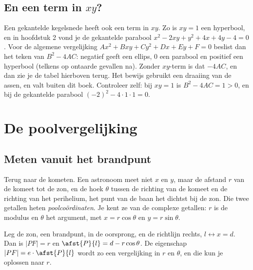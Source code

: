 
\begin{oefeningen}
\end{oefeningen}

\subsection{En een term in \texorpdfstring{$xy$}{xy}?}

Een gekantelde kegelsnede heeft ook een term in $xy$. Zo is $xy = 1$ een hyperbool, en in hoofdstuk 2 vond je de gekantelde parabool $x^2 - 2xy + y^2 + 4x + 4y - 4 = 0$. Voor de algemene vergelijking $Ax^2 + Bxy + Cy^2 + Dx + Ey + F = 0$ beslist dan het teken van $B^2 - 4AC$: negatief geeft een ellips, 0 een parabool en positief een hyperbool (telkens op ontaarde gevallen na). Zonder $xy$-term is dat $-4AC$, en dan zie je de tabel hierboven terug. Het bewijs gebruikt een draaiing van de assen, en valt buiten dit boek. Controleer zelf: bij $xy = 1$ is $B^2 - 4AC = 1 > 0$, en bij de gekantelde parabool $(-2)^2 - 4 \cdot 1 \cdot 1 = 0$.

\section{De poolvergelijking}

\subsection{Meten vanuit het brandpunt}

Terug naar de kometen. Een astronoom meet niet $x$ en $y$, maar de afstand $r$ van de komeet tot de zon, en de hoek $\theta$ tussen de richting van de komeet en de richting van het perihelium, het punt van de baan het dichtst bij de zon. Die twee getallen heten \emph{poolcoördinaten}. Je kent ze van de complexe getallen: $r$ is de modulus en $\theta$ het argument, met $x = r\cos\theta$ en $y = r\sin\theta$.

Leg de zon, een brandpunt, in de oorsprong, en de richtlijn rechts, $l \leftrightarrow x = d$. Dan is $|PF| = r$ en $\afst{P}{l} = d - r\cos\theta$. De eigenschap $|PF| = e \cdot \afst{P}{l}$ wordt zo een vergelijking in $r$ en $\theta$, en die kun je oplossen naar $r$.

